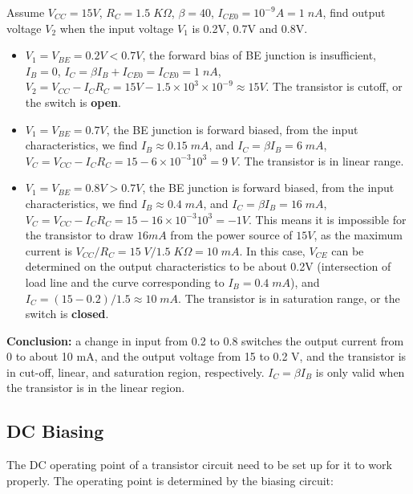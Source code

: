 Assume $V_{CC}=15V$, $R_C=1.5\;K\Omega$, $\beta=40$, $I_{CE0}=10^{-9}A=1\;nA$, 
find output voltage $V_2$ when the input voltage $V_1$ is 0.2V, 0.7V and 0.8V.
\begin{itemize}
\item $V_1=V_{BE}=0.2V < 0.7V$, the forward bias of BE junction is 
	insufficient, $I_B=0$, $I_C=\beta I_B+I_{CE0}=I_{CE0}=1\;nA$, 
	$V_2=V_{CC}-I_C R_C=15V-1.5\times 10^{3}\times 10^{-9}\approx 15V$. 
	The transistor is cutoff, or the switch is {\bf open}.
\item $V_1=V_{BE}=0.7V$, the BE junction is forward biased, from the input
	characteristics, we find $I_B\approx 0.15\;mA$, and $I_C=\beta I_B=6
	\;mA$, $V_C=V_{CC}-I_C R_C=15-6\times 10^{-3} 10^{3}=9\; V$. The
	transistor is in linear range.
\item $V_1=V_{BE}=0.8V>0.7V$, the BE junction is forward biased, from the input
	characteristics, we find $I_B\approx 0.4\;mA$, and $I_C=\beta I_B=16
	\;mA$, $V_C=V_{CC}-I_C R_C=15-16\times 10^{-3} 10^{3}=-1 V$. This 
	means it is impossible for the transistor to draw $16mA$ from the 
	power source of $15V$, as the maximum current is 
	$V_{CC}/R_C=15\;V/1.5\;K\Omega=10\;mA$. In this case, $V_{CE}$ can 
	be determined on the output characteristics to be about 0.2V 
	(intersection of load line and the curve corresponding to 
	$I_B=0.4\;mA$), and $I_C=(15-0.2)/1.5\approx 10\;mA$. The transistor
	is in saturation range, or the switch is {\bf closed}.

\end{itemize}
{\bf Conclusion: } a change in input from 0.2 to 0.8 switches the output 
	current from 0 to about 10 mA, and the output voltage from 15 to 0.2 V,
	and the transistor is in cut-off, linear, and saturation region,
	respectively. 
	$I_C=\beta I_B$ is only valid when the transistor is in the linear
	region.

\subsection*{DC Biasing}

The DC operating point of a transistor circuit need to be set up for it to 
work properly. The operating point is determined by the biasing circuit:


